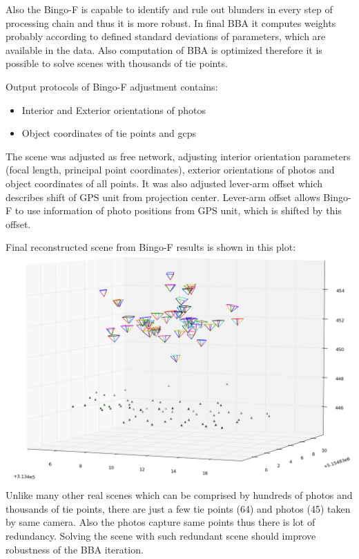 \documentclass[a4paper,12pt]{article}
\begin{document}
Also the Bingo-F is capable to identify and rule out blunders in every step of processing chain and thus it is more robust. 
In final BBA it computes weights probably according to defined standard deviations of parameters, which are available in the data. Also computation 
of BBA is optimized therefore it is possible to solve scenes with thousands of tie points.

Output  protocols of Bingo-F adjustment contains: 

\begin{itemize}
\item Interior and Exterior orientations of photos
\item Object coordinates of tie points and gcps
\end{itemize}

The scene was adjusted as free network, adjusting interior orientation parameters (focal length, principal point coordinates),
exterior orientations of photos and object coordinates of all points. It was also adjusted lever-arm offset which describes 
shift of GPS unit from projection center.  Lever-arm offset allows Bingo-F to use information of photo positions from GPS unit,
which is shifted by this offset.  

Final reconstructed  scene from Bingo-F results is shown in this plot:
\includegraphics[scale=0.5]{figures/bingo_result.png}
Unlike many other real scenes which can be comprised by hundreds of photos and thousands of tie points,   
there are just a few tie points (64) and photos (45) taken by same camera. Also the photos capture same points thus there 
is lot of redundancy. Solving the scene with such redundant scene should improve robustness of the BBA iteration. 
\end{document}
